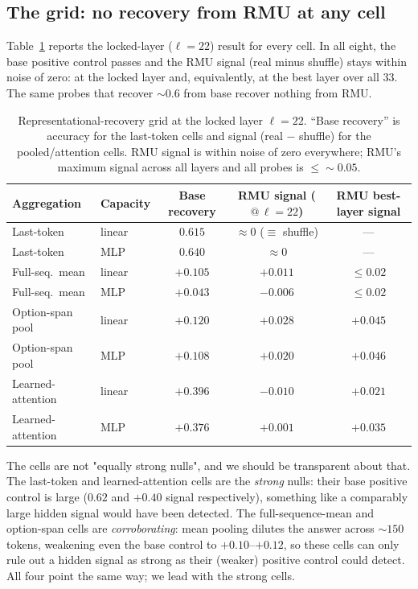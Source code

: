 \documentclass[11pt]{article}
\begin{document}
\subsection{The grid: no recovery from RMU at any cell}
Table~\ref{tab:grid} reports the locked-layer ($\ell=22$) result for every cell. In all
eight, the base positive control passes and the RMU signal (real minus shuffle) stays
within noise of zero: at the locked layer and, equivalently, at the best layer over all
$33$. The same probes that recover $\sim\!0.6$ from base recover nothing from RMU.


\begin{table}[h]
\centering
\small
\begin{tabular}{llccc}
\toprule
Aggregation & Capacity & Base recovery & RMU signal ($@\,\ell{=}22$) & RMU best-layer signal \\
\midrule
Last-token        & linear & $0.615$ & $\approx 0$ ($\equiv$ shuffle) & --- \\
Last-token        & MLP    & $0.640$ & $\approx 0$ & --- \\
Full-seq.\ mean   & linear & $+0.105$ & $+0.011$ & $\le 0.02$ \\
Full-seq.\ mean   & MLP    & $+0.043$ & $-0.006$ & $\le 0.02$ \\
Option-span pool  & linear & $+0.120$ & $+0.028$ & $+0.045$ \\
Option-span pool  & MLP    & $+0.108$ & $+0.020$ & $+0.046$ \\
Learned-attention & linear & $+0.396$ & $-0.010$ & $+0.021$ \\
Learned-attention & MLP    & $+0.376$ & $+0.001$ & $+0.035$ \\
\bottomrule
\end{tabular}
\caption{Representational-recovery grid at the locked layer $\ell=22$. ``Base recovery''
is accuracy for the last-token cells and signal (real $-$ shuffle) for the pooled/attention
cells. RMU signal is within noise of zero everywhere; RMU's maximum signal across all
layers and all probes is $\le\!\sim\!0.05$.}
\label{tab:grid}
\end{table}


The cells are not "equally strong nulls", and we should be transparent about that. The last-token and
learned-attention cells are the \emph{strong} nulls: their base positive control is large
($0.62$ and $+0.40$ signal respectively), something like a comparably large hidden signal would have
been detected. The full-sequence-mean and option-span cells are \emph{corroborating}: mean
pooling dilutes the answer across $\sim\!150$ tokens, weakening even the base control to
$+0.10$--$+0.12$, so these cells can only rule out a hidden signal as strong as their
(weaker) positive control could detect. All four point the same way; we lead with the
strong cells.
\end{document}
